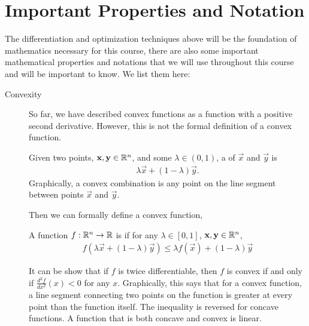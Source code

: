 \section{Important Properties and Notation}
The differentiation and optimization techniques above will be the foundation of mathematics necessary for this course, there are also some important mathematical properties and notations that we will use throughout this course and will be important to know. We list them here:
\begin{description}
    \item[Convexity] \label{def:convexity} So far, we have described convex functions as a function with a positive second derivative. However, this is not the formal definition of a convex function. 
    
    \begin{definition*}
        Given two points, $\mathbf{x}, \mathbf{y} \in \mathbb{R}^n$, and some $\lambda \in (0, 1)$, a  of $\vec{x}$ and $\vec{y}$ is 
        \begin{align*}
            \lambda \vec{x} + (1 - \lambda) \vec{y}.
        \end{align*}
        Graphically, a convex combination is any point on the line segment between points $\vec{x}$ and $\vec{y}$. 

    \end{definition*}
    
    Then we can formally define a convex function, 
    \begin{definition*} 
        A function $f: \mathbb{R}^n \to \mathbb{R}$ is  if for any $\lambda \in [0, 1]$, $\mathbf{x}, \mathbf{y} \in \mathbb{R}^n$,
        \begin{align*}
            f(\lambda \vec{x} + (1 - \lambda) \vec{y}) \leq \lambda f(\vec{x}) + (1 - \lambda) \vec{y}
        \end{align*}
    \end{definition*}

    It can be show that if $f$ is twice differentiable, then $f$ is convex if and only if $\frac{d^2f}{dx^2}(x) < 0$ for any $x$. Graphically, this says that for a convex function, a line segment connecting two points on the function is greater at every point than the function itself. The inequality is reversed for concave functions. A function that is both concave and convex is linear.


\end{description}
